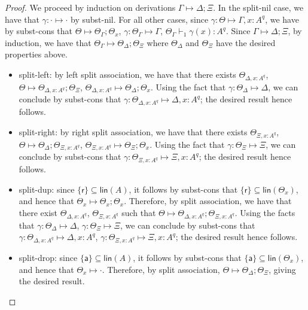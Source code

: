 \documentclass[acmsmall,screen,review]{acmart}
\newcommand{\ms}[1]{\ensuremath{\mathsf{#1}}}
\newcommand{\csplits}[3]{#1 \mapsto #2;#3}
\newcommand{\cwk}[2]{#1 \mapsto #2}
\newcommand{\tlin}[2]{#2 \subseteq \ms{lin}(#1)}
\newcommand{\thyp}[3]{#1: {#2}^{#3}}
\newcommand{\rle}[1]{{\scriptsize\textsf{#1}}}
\newcommand{\taff}{{\{\ms{a}\}}}
\newcommand{\trel}{{\{\ms{r}\}}}
\newcommand{\hasty}[5]{#1 \vdash_{#2} #3: {#4}^{#5}}
\newcommand{\issubst}[3]{#1: #2 \mapsto #3}
\begin{document}
\begin{proof} 
  We proceed by induction on derivations \(\csplits{\Gamma}{\Delta}{\Xi}\). In
  the \rle{split-nil} case, we have that \(\issubst{\gamma}{\cdot}{\cdot}\) by
  \rle{subst-nil}. For all other cases, since \(\issubst{\gamma}{\Theta}{\Gamma,
  \thyp{x}{A}{q}}\), we have by \rle{subst-cons} that
  \(\csplits{\Theta}{\Theta_\Gamma}{\Theta_x}\),
  \(\issubst{\gamma}{\Theta_\Gamma}{\Gamma}\),
  \(\hasty{\Theta_\Gamma}{1}{\gamma(x)}{A}{q}\). Since
  \(\csplits{\Gamma}{\Delta}{\Xi}\), by induction, we have that
  \(\csplits{\Theta_\Gamma}{\Theta_\Delta}{\Theta_\Xi}\) where \(\Theta_\Delta\)
  and \(\Theta_\Xi\) have the desired properties above.
  \begin{itemize}
    \item \rle{split-left}: by left split association, we have that there exists
    \(\Theta_{\Delta, \thyp{x}{A}{q}}\), \(\csplits{\Theta}{\Theta_{\Delta,
    \thyp{x}{A}{q}}}{\Theta_\Xi}\), \(\csplits{\Theta_{\Delta,
    \thyp{x}{A}{q}}}{\Theta_\Delta}{\Theta_x}\). Using the fact that
    \(\issubst{\gamma}{\Theta_\Delta}{\Delta}\), we can conclude by
    \rle{subst-cons} that \(\issubst{\gamma}{\Theta_{\Delta,
    \thyp{x}{A}{q}}}{\Delta, \thyp{x}{A}{q}}\); the desired result hence
    follows.
    \item \rle{split-right}: by right split association, we have that there
    exists \(\Theta_{\Xi, \thyp{x}{A}{q}}\),
    \(\csplits{\Theta}{\Theta_\Delta}{\Theta_{\Xi, \thyp{x}{A}{q}}}\),
    \(\csplits{\Theta_{\Xi, \thyp{x}{A}{q}}}{\Theta_\Xi}{\Theta_x}\). Using the
    fact that \(\issubst{\gamma}{\Theta_\Xi}{\Xi}\), we can conclude by
    \rle{subst-cons} that \(\issubst{\gamma}{\Theta_{\Xi, \thyp{x}{A}{q}}}{\Xi,
    \thyp{x}{A}{q}}\); the desired result hence follows.
    \item \rle{split-dup}: since \(\tlin{A}{\trel}\), it follows by
    \rle{subst-cons} that \(\tlin{\Theta_x}{\trel}\), and hence that
    \(\csplits{\Theta_x}{\Theta_x}{\Theta_x}\). Therefore, by split association,
    we have that there exist \(\Theta_{\Delta, \thyp{x}{A}{q}}\), \(\Theta_{\Xi,
    \thyp{x}{A}{q}}\) such that \(\csplits{\Theta}{\Theta_{\Delta,
    \thyp{x}{A}{q}}}{\Theta_{\Xi, \thyp{x}{A}{q}}}\). Using the facts that
    \(\issubst{\gamma}{\Theta_\Delta}{\Delta}\),
    \(\issubst{\gamma}{\Theta_\Xi}{\Xi}\), we can conclude by \rle{subst-cons}
    that \(\issubst{\gamma}{\Theta_{\Delta, \thyp{x}{A}{q}}}{\Delta,
    \thyp{x}{A}{q}}\), \(\issubst{\gamma}{\Theta_{\Xi, \thyp{x}{A}{q}}}{\Xi,
    \thyp{x}{A}{q}}\); the desired result hence follows.
    \item \rle{split-drop}: since \(\tlin{A}{\taff}\), it follows by
    \rle{subst-cons} that \(\tlin{\Theta_x}{\taff}\), and hence that
    \(\cwk{\Theta_x}{\cdot}\). Therefore, by split association,
    \(\csplits{\Theta}{\Theta_\Delta}{\Theta_\Xi}\), giving the desired result.
  \end{itemize}
\end{proof}
\end{document}
